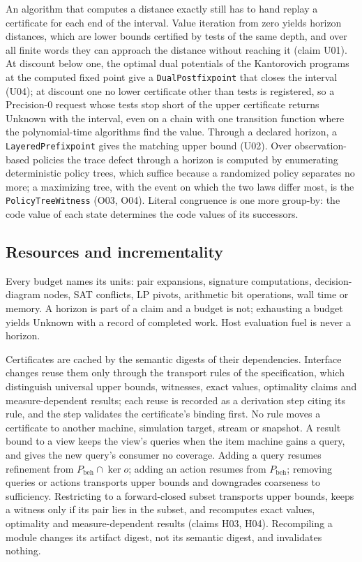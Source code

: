 \documentclass[11pt]{article}
\newcommand{\code}[1]{\texttt{#1}}
\newcommand{\Pbeh}{P_{\mathrm{beh}}}
\begin{document}
An algorithm that computes a distance exactly still has to hand replay a certificate for each end of
the interval. Value iteration from zero yields horizon distances, which are lower bounds certified
by tests of the same depth, and over all finite words they can approach the distance without
reaching it (claim U01). At discount below one, the optimal dual potentials of the Kantorovich
programs at the computed fixed point give a \code{DualPostfixpoint} that closes the interval (U04);
at discount one no lower
certificate other than tests is registered, so a Precision-0 request whose tests stop short of the
upper certificate returns Unknown with the interval, even on a chain with one transition function
where the polynomial-time algorithms find the value. Through a declared horizon, a
\code{LayeredPrefixpoint} gives the matching upper bound (U02). Over observation-based policies the
trace defect through a horizon is computed by enumerating deterministic policy trees, which suffice
because a randomized policy separates no more; a maximizing tree, with the event on which the two
laws differ most, is the \code{PolicyTreeWitness} (O03, O04). Literal congruence is one more
group-by: the code value of each state determines the code values of its successors.

\subsection{Resources and incrementality}\label{sec:resources}

Every budget names its units: pair expansions, signature computations, decision-diagram nodes, SAT
conflicts, LP pivots, arithmetic bit operations, wall time or memory. A horizon is part of a claim and
a budget is not; exhausting a budget yields Unknown with a record of completed work. Host evaluation
fuel is never a horizon.

Certificates are cached by the semantic digests of their dependencies. Interface changes reuse them
only through the transport rules of the specification, which distinguish universal upper bounds,
witnesses, exact values, optimality claims and measure-dependent results; each reuse is recorded as a
derivation step citing its rule, and the step validates the certificate's binding first. No rule
moves a certificate to another machine, simulation target, stream or snapshot. A result bound to a
view keeps the view's queries when the item machine gains a query, and gives the new query's
consumer no coverage. Adding a query resumes refinement from $\Pbeh\cap\ker o$; adding an
action resumes from $\Pbeh$; removing queries or actions transports upper bounds and downgrades
coarseness to sufficiency. Restricting to a forward-closed subset transports upper bounds, keeps a
witness only if its pair lies in the subset, and recomputes exact values, optimality and
measure-dependent results (claims H03, H04). Recompiling a module changes its artifact digest, not its
semantic digest, and invalidates nothing.
\end{document}
